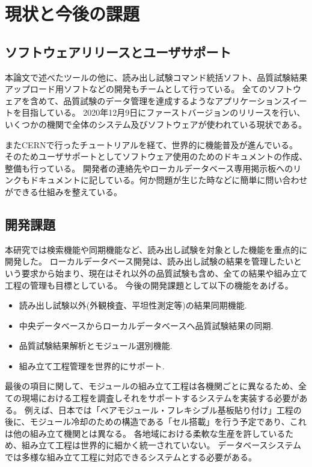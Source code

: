 \section{現状と今後の課題}
\subsection{ソフトウェアリリースとユーザサポート}
本論文で述べたツールの他に、読み出し試験コマンド統括ソフト、品質試験結果アップロード用ソフトなどの開発もチームとして行っている。
全てのソフトウェアを含めて、品質試験のデータ管理を達成するようなアプリケーションスイートを目指している。
2020年12月9日にファーストバージョンのリリースを行い、いくつかの機関で全体のシステム及びソフトウェアが使われている現状である。

またCERNで行ったチュートリアルを経て、世界的に機能普及が進んでいる。
そのためユーザサポートとしてソフトウェア使用のためのドキュメント\cite{7-1}の作成、整備も行っている。
開発者の連絡先やローカルデータベース専用掲示板へのリンクもドキュメントに記している。何か問題が生じた時などに簡単に問い合わせができる仕組みを整えている。

\subsection{開発課題}
本研究では検索機能や同期機能など、読み出し試験を対象とした機能を重点的に開発した。
ローカルデータベース開発は、読み出し試験の結果を管理したいという要求から始まり、現在はそれ以外の品質試験も含め、全ての結果や組み立て工程の管理も目標としている。
今後の開発課題として以下の機能をあげる。
\begin{itemize}
  \item 読み出し試験以外(外観検査、平坦性測定等)の結果同期機能.
  \item 中央データベースからローカルデータベースへ品質試験結果の同期.
  \item 品質試験結果解析とモジュール選別機能. 
  \item 組み立て工程管理を世界的にサポート.
\end{itemize}

最後の項目に関して、モジュールの組み立て工程は各機関ごとに異なるため、全ての現場における工程を調査しそれをサポートするシステムを実装する必要がある。
例えば、日本では「ベアモジュール・フレキシブル基板貼り付け」工程の後に、モジュール冷却のための構造である「セル搭載」を行う予定であり、これは他の組み立て機関とは異なる。
各地域における柔軟な生産を許しているため、組み立て工程は世界的に細かく統一されていない。
データベースシステムでは多様な組み立て工程に対応できるシステムとする必要がある。

